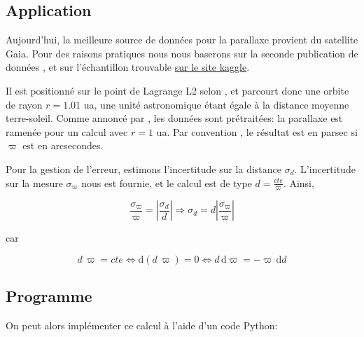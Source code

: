\documentclass[12pt,a4paper,french]{scrartcl}
\begin{document}
\subsection{Application}

Aujourd'hui, la meilleure source de données pour la parallaxe provient du satellite Gaia. 
Pour des raisons pratiques nous nous baserons sur la seconde publication de données \citep{DR2}, et sur l'échantillon 
trouvable \href{https://www.kaggle.com/datasets/solorzano/783k-gaia-dr2-stars}{sur le site kaggle}.

Il est positionné sur le point de Lagrange L2 selon \citet{esa_scanning-law}, et parcourt donc une orbite de rayon 
$r=1.01$ ua, une unité astronomique étant égale à la distance moyenne terre-soleil. Comme annoncé par \citet[Section~3.1]{DR2},
les données sont prétraitées: la parallaxe est ramenée pour un calcul avec $r=1$ ua.
Par convention \citep{parsec-def}, le résultat est en parsec si $\varpi$ est en arcsecondes.

Pour la gestion de l'erreur, estimons l'incertitude sur la distance $\sigma_d$. 
L'incertitude sur la mesure $\sigma_\varpi$ nous est fournie, et le calcul est de type $d=\frac{cte}\varpi$. Ainsi,

\begin{equation}\label{eq.parallax-error}
    \frac{\sigma_\varpi}{\varpi}=\left|\frac{\sigma_d}{d}\right| \Longrightarrow
    \sigma_d=d\left|\frac{\sigma_\varpi}{\varpi}\right|
\end{equation}

car

\[
d\, \varpi=cte \Leftrightarrow \mathrm{d} (d\,\varpi)=0 \Leftrightarrow d\,\mathrm{d} \varpi=-\varpi\,\mathrm{d} d
\]

\subsection{Programme}

On peut alors implémenter ce calcul à l'aide d'un code Python:
\end{document}
